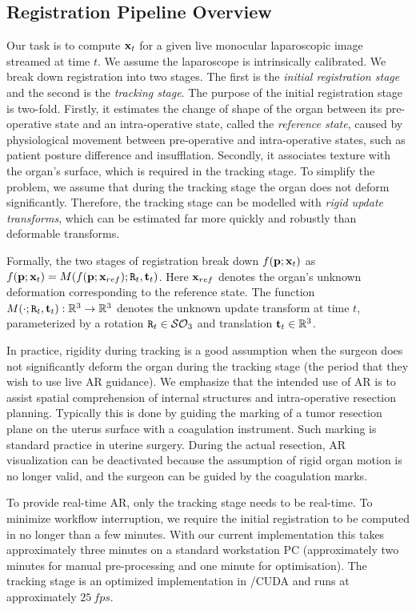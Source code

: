 \subsection{Registration Pipeline Overview}
\label{sec:globalOverview}
Our task is to compute $\mathbf{x}_t$ for a given live monocular laparoscopic image streamed at time $t$. We assume the laparoscope is intrinsically calibrated.
We break down registration into two stages. The first is the \textit{initial registration stage} and the second is the \emph{tracking stage}. The purpose of the initial registration stage is two-fold. Firstly, it estimates the change of shape of the organ between its pre-operative state and an intra-operative state, called the \emph{reference state}, caused by physiological movement between pre-operative and intra-operative states, such as patient posture difference and insufflation. Secondly, it associates texture with the organ's surface, which is required in the tracking stage.
To simplify the problem, we assume that during the tracking stage the organ does not deform significantly. Therefore, the tracking stage can be modelled with \emph{rigid update transforms}, which can be estimated far more quickly and robustly than deformable transforms. 

Formally, the two stages of registration break down $f(\mathbf{p};\mathbf{x}_t)$ as $f(\vet{p};\vet{x}_{t})=M(f(\vet{p};\vet{x}_{ref});\mat{R}_{t},\vet{t}_{t})$. Here $\mathbf{x}_{ref}$ denotes the organ's unknown deformation corresponding to the reference state.
The function $M(\cdot;\mat{R}_{t},\vet{t}_{t}):\mathbb{R}^3\rightarrow \mathbb{R}^3$ denotes the unknown update transform at time $t$, parameterized by a rotation $\mat{R}_{t}\in \mathcal{SO}_{3}$ and translation $\mathbf{t}_{t}\in \mathbb{R}^3$.

In practice, rigidity during tracking is a good assumption when the surgeon does not significantly deform the organ during the tracking stage (\ie the period that they wish to use live AR guidance). We emphasize that the intended use of AR is to assist spatial comprehension of internal structures and intra-operative resection planning. Typically this is done by guiding the marking of a tumor resection plane on the uterus surface with a coagulation instrument. Such marking is standard practice in uterine surgery. During the actual resection, AR visualization can be deactivated because the assumption of rigid organ motion is no longer valid, and the surgeon can be guided by the coagulation marks.

To provide real-time AR, only the tracking stage needs to be real-time. To minimize workflow interruption, we require the initial registration to be computed in no longer than a few minutes. With our current implementation this takes approximately three minutes on a standard workstation PC (approximately two minutes for manual pre-processing and one minute for optimisation). 
The tracking stage is an optimized implementation in \CC/CUDA and runs at approximately $\SI{25}{fps}$.